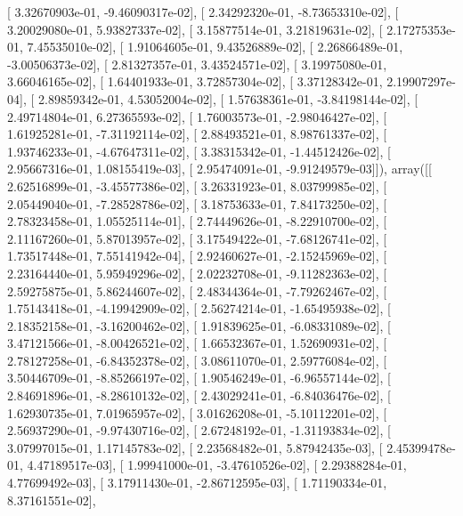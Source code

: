 \documentclass{article}
\begin{document}
       [  3.32670903e-01,  -9.46090317e-02],
       [  2.34292320e-01,  -8.73653310e-02],
       [  3.20029080e-01,   5.93827337e-02],
       [  3.15877514e-01,   3.21819631e-02],
       [  2.17275353e-01,   7.45535010e-02],
       [  1.91064605e-01,   9.43526889e-02],
       [  2.26866489e-01,  -3.00506373e-02],
       [  2.81327357e-01,   3.43524571e-02],
       [  3.19975080e-01,   3.66046165e-02],
       [  1.64401933e-01,   3.72857304e-02],
       [  3.37128342e-01,   2.19907297e-04],
       [  2.89859342e-01,   4.53052004e-02],
       [  1.57638361e-01,  -3.84198144e-02],
       [  2.49714804e-01,   6.27365593e-02],
       [  1.76003573e-01,  -2.98046427e-02],
       [  1.61925281e-01,  -7.31192114e-02],
       [  2.88493521e-01,   8.98761337e-02],
       [  1.93746233e-01,  -4.67647311e-02],
       [  3.38315342e-01,  -1.44512426e-02],
       [  2.95667316e-01,   1.08155419e-03],
       [  2.95474091e-01,  -9.91249579e-03]]), array([[  2.62516899e-01,  -3.45577386e-02],
       [  3.26331923e-01,   8.03799985e-02],
       [  2.05449040e-01,  -7.28528786e-02],
       [  3.18753633e-01,   7.84173250e-02],
       [  2.78323458e-01,   1.05525114e-01],
       [  2.74449626e-01,  -8.22910700e-02],
       [  2.11167260e-01,   5.87013957e-02],
       [  3.17549422e-01,  -7.68126741e-02],
       [  1.73517448e-01,   7.55141942e-04],
       [  2.92460627e-01,  -2.15245969e-02],
       [  2.23164440e-01,   5.95949296e-02],
       [  2.02232708e-01,  -9.11282363e-02],
       [  2.59275875e-01,   5.86244607e-02],
       [  2.48344364e-01,  -7.79262467e-02],
       [  1.75143418e-01,  -4.19942909e-02],
       [  2.56274214e-01,  -1.65495938e-02],
       [  2.18352158e-01,  -3.16200462e-02],
       [  1.91839625e-01,  -6.08331089e-02],
       [  3.47121566e-01,  -8.00426521e-02],
       [  1.66532367e-01,   1.52690931e-02],
       [  2.78127258e-01,  -6.84352378e-02],
       [  3.08611070e-01,   2.59776084e-02],
       [  3.50446709e-01,  -8.85266197e-02],
       [  1.90546249e-01,  -6.96557144e-02],
       [  2.84691896e-01,  -8.28610132e-02],
       [  2.43029241e-01,  -6.84036476e-02],
       [  1.62930735e-01,   7.01965957e-02],
       [  3.01626208e-01,  -5.10112201e-02],
       [  2.56937290e-01,  -9.97430716e-02],
       [  2.67248192e-01,  -1.31193834e-02],
       [  3.07997015e-01,   1.17145783e-02],
       [  2.23568482e-01,   5.87942435e-03],
       [  2.45399478e-01,   4.47189517e-03],
       [  1.99941000e-01,  -3.47610526e-02],
       [  2.29388284e-01,   4.77699492e-03],
       [  3.17911430e-01,  -2.86712595e-03],
       [  1.71190334e-01,   8.37161551e-02],
\end{document}
